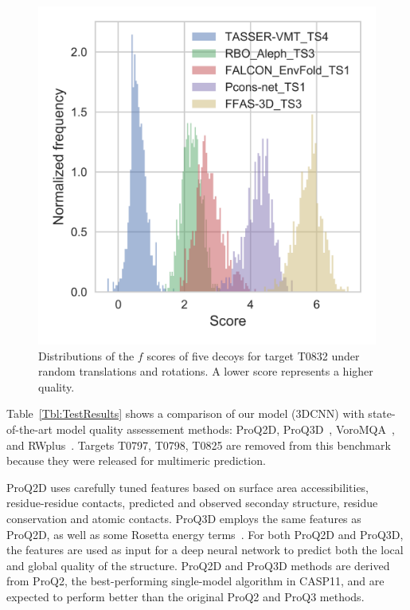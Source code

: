 \documentclass{bioinfo}
\begin{document}
\begin{figure}[!tpb]
    \centering
    \includegraphics[width=\linewidth]{image5.png}
    \caption{Distributions of the $f$ scores of five decoys for target
    T0832 under random translations and rotations. A lower score
    represents a higher quality.}
    \label{Fig:DecoysScoreDistribution}
\end{figure}

Table~\ref{Tbl:TestResults} shows a comparison of our model (3DCNN)
with state-of-the-art model quality assessement methods: ProQ2D,
ProQ3D~\citep{uziela2017proq3d}, VoroMQA~\citep{olechnovivc2017voromqa},
and RWplus~\citep{zhang2010novel}.
Targets T0797, T0798, T0825 are removed from this benchmark because
they were released for multimeric prediction.

ProQ2D uses carefully tuned features based on surface area
accessibilities, residue-residue contacts, predicted and observed
seconday structure, residue conservation and atomic contacts. ProQ3D
employs the same features as ProQ2D, as well as some Rosetta energy
terms~\citep{leaverfay2011rosetta}. For both ProQ2D and ProQ3D, the
features are used as input for a deep neural network to predict both
the local and global quality of the structure.
ProQ2D and ProQ3D methods are derived from ProQ2, the best-performing
single-model algorithm in CASP11, and are expected to perform better
than the original ProQ2 and ProQ3 methods.
\end{document}
